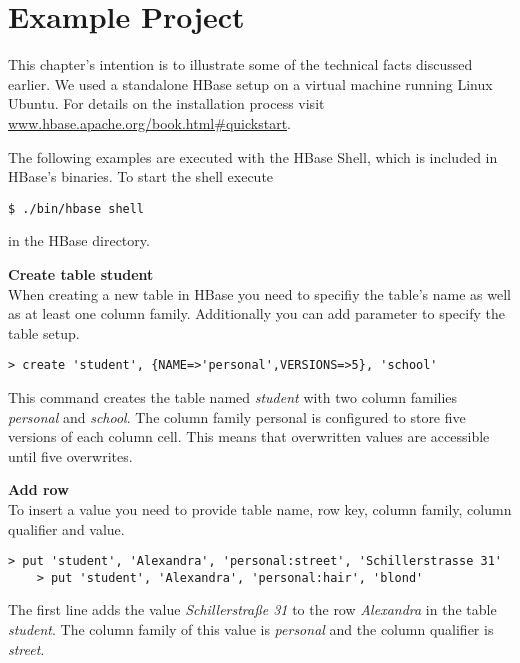 
\section{Example Project}
\label{lblHBaseExample}

This chapter's intention is to illustrate some of the technical facts discussed earlier. We used a standalone HBase setup on a virtual machine running Linux Ubuntu. For details on the installation process visit \href{www.hbase.apache.org/book.html\#quickstart}{www.hbase.apache.org/book.html\#quickstart}.

The following examples are executed with the HBase Shell, which is included in HBase's binaries. To start the shell execute 
\begin{lstlisting}[caption={start HBase shell},label=lst:hbas_shell]
	$ ./bin/hbase shell
\end{lstlisting}
in the HBase directory. 

\textbf{Create table student} \\
When creating a new table in HBase you need to specifiy the table's name as well as at least one column family. Additionally you can add parameter to specify the table setup. 
\begin{lstlisting}[caption={create table},label=lst:create_table]
	> create 'student', {NAME=>'personal',VERSIONS=>5}, 'school'
\end{lstlisting}
This command creates the table named \textit{student} with two column families \textit{personal} and \textit{school}. The column family personal is configured to store five versions of each column cell. This means that overwritten values are accessible until five overwrites. 

\textbf{Add row} \\
To insert a value you need to provide table name, row key, column family, column qualifier and value. 

\begin{lstlisting}[caption={insert values},label=lst:insert_values]
	> put 'student', 'Alexandra', 'personal:street', 'Schillerstrasse 31'
	> put 'student', 'Alexandra', 'personal:hair', 'blond'
\end{lstlisting}

The first line adds the value \textit{Schillerstraße 31} to the row \textit{Alexandra} in the table \textit{student}. The column family of this value is \textit{personal} and the column qualifier is \textit{street}. 

